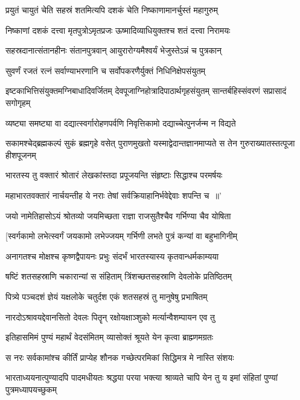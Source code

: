 \twolineshloka
{प्रयुतं चायुतं चेति सहस्रं शतमित्यपि}
{दशकं चेति निष्काणामानर्चुस्तं महागुरुम्}


\twolineshloka
{निष्काणां दशकं दत्त्वा मृतपुत्रोऽमृतप्रजः}
{ऊष्मादिव्याधियुक्तश्च शतं दत्त्वा निरामयः}


\twolineshloka
{सहस्रदानात्संतानहीनः संतानपुत्रवान्}
{आयुरारोग्यमैश्वर्यं भेजुस्तेऽन्नं च पुत्रकान्}


\twolineshloka
{सुवर्णं रजतं रत्नं सर्वाण्याभरणानि च}
{सर्वोपकरणैर्युक्तं निधिनिक्षेपसंयुतम्}


\threelineshloka
{इष्टकाभित्तिसंयुक्तमग्निबाधादिवर्जितम्}
{देवपूजाग्निहोत्रादिपाठार्थगृहसंयुतम्}
{सान्तर्बहिस्संवरणं सप्रासादं सगोगृहम्}


\twolineshloka
{व्यष्ट्या समष्ट्या वा दद्यात्स्वर्गारोहणपर्वणि}
{निवृत्तिकामो दद्याच्चेत्पुनर्जन्म न विद्यते}


सकामश्चेद्ब्रह्मकल्पं सुकं ब्रह्मगृहे वसेत्
\twolineshloka
{पुराणमुखतो यस्माद्वेदान्तज्ञानमाप्यते}
{स तेन गुरुराख्यातस्तत्पूजा हीशपूजनम्}


\twolineshloka
{भारतस्य तु वक्तारं श्रोतारं लेखकांस्तदा}
{प्रपूजयन्ति संहृष्टाः सिद्धाश्च परमर्षयः}


\twolineshloka
{महाभारतवक्तारं नार्चयन्तीह ये नराः}
{तेषां सर्वक्रियाहानिर्भवेद्देवाः शपन्ति च ॥'}


\twolineshloka
{जयो नामेतिहासोऽयं श्रोतव्यो जयमिच्छता}
{राज्ञा राजसुतैश्चैव गर्भिण्या चैव योषिता}


\twolineshloka
{[स्वर्गकामो लभेत्स्वर्गं जयकामो लभेज्जयम्}
{गर्भिणी लभते पुत्रं कन्यां वा बहुभागिनीम्}


\twolineshloka
{अनागतश्च मोक्षश्च कृष्णद्वैपायनः प्रभुः}
{संदर्भं भारतस्यास्य कृतवान्धर्मकाम्यया}


\twolineshloka
{षष्टिं शतसहस्राणि चकारान्यां स संहिताम्}
{त्रिंशच्छतसहस्राणि देवलोके प्रतिष्ठितम्}


\twolineshloka
{पित्र्ये पञ्चदशं ज्ञेयं यक्षलोके चतुर्दश}
{एकं शतसहस्रं तु मानुषेषु प्रभाषितम्}


\twolineshloka
{नारदोऽश्रावयद्देवानसितो देवलः पितॄन्}
{रक्षोयक्षाञ्शुको मर्त्यान्वैशम्पायन एव तु}


\twolineshloka
{इतिहासमिमं पुण्यं महार्थं वेदसंमितम्}
{व्यासोक्तं श्रूयते येन कृत्वा ब्राह्म्णमग्रतः}


\twolineshloka
{स नरः सर्वकामांश्च कीर्तिं प्राप्येह शौनक}
{गच्छेत्परमिकां सिद्धिमत्र मे नास्ति संशयः}


\threelineshloka
{भारताध्ययनात्पुण्यादपि पादमधीयतः}
{श्रद्धया परया भक्त्या श्राव्यते चापि येन तु}
{य इमां संहितां पुण्यां पुत्रमध्यापयच्छुकम्}


